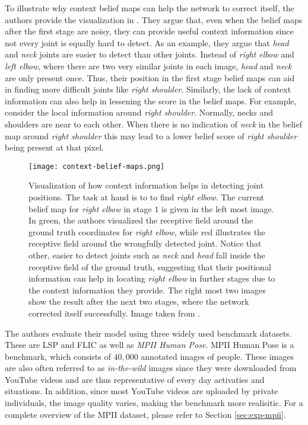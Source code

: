 To illustrate why context belief maps can help the network to correct itself, the authors provide the visualization in .
They argue that, even when the belief maps after the first stage are noisy, they can provide useful context information since not every joint is equally hard to detect.
As an example, they argue that \textit{head} and \textit{neck} joints are easier to detect than other joints.
Instead of \textit{right elbow} and \textit{left elbow}, where there are two very similar joints in each image, \textit{head} and \textit{neck} are only present once.
Thus, their position in the first stage belief maps can aid in finding more difficult joints like \textit{right shoulder}.
Similarly, the lack of context information can also help in lessening the score in the belief maps.
For example, consider the local information around \textit{right shoulder}.
Normally, necks and shoulders are near to each other.
When there is no indication of \textit{neck} in the belief map around \textit{right shoulder} this may lead to a lower belief score of \textit{right shoulder} being present at that pixel. 

\begin{figure}[htb!]
    \centering
    \texttt{[image: context-belief-maps.png]}
    \caption{Visualization of how context information helps in detecting joint positions. The task at hand is to to find \textit{right elbow}. The current belief map for \textit{right elbow} in stage $1$ is given in the left most image. In green, the authors visualized the receptive field around the ground truth coordinates for \textit{right elbow}, while red illustrates the receptive field around the wrongfully detected joint. Notice that other, easier to detect joints such as \textit{neck} and \textit{head} fall inside the receptive field of the ground truth, suggesting that their positional information can help in locating \textit{right elbow} in further stages due to the context information they provide. The right most two images show the result after the next two stages, where the network corrected itself successfully. Image taken from \cite{wei_convolutional_2016}.}
    \label{fig:context-belief-maps}
\end{figure}

\label{sec:pose-machine-evaluation}

The authors evaluate their model using three widely used benchmark datasets.
These are LSP and FLIC  as well as \textit{MPII Human Pose}.  
MPII Human Pose is a benchmark, which consists of $40,000$ annotated images of people.
These images are also often referred to as \textit{in-the-wild} images since they were downloaded from YouTube videos and are thus representative of every day activaties and situations.
In addition, since most YouTube videos are uploaded by private individuals, the image quality varies, making the benchmark more realisitic.
For a complete overview of the MPII dataset, please refer to Section \ref{sec:exp-mpii}.

